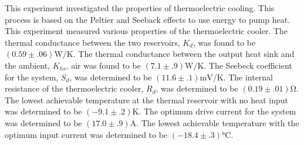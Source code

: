 

\physics

\begin{paperabs}
	
	This experiment investigated the properties of thermoelectric cooling. This
process is based on the Peltier and Seeback effects to use energy to pump heat.
This experiment measured various properties of the thermoelectric cooler.
The thermal conductance between the two reservoirs, $K_d$, was found to be $(0.59\pm.06)\si{\watt\per\kelvin}$.
The thermal conductance between the output heat sink and the ambient, $K_{hs}$, air was found to be $(7.1\pm.9)\si{\watt\per\kelvin}$.
The Seebeck coefficient for the system, $S_d$, was determined to be $(11.6\pm.1)\si{\milli\volt\per\kelvin}$.
The internal resistance of the thermoelectric cooler, $R_d$, was determined to be $(0.19\pm.01)\si{\ohm}$.
The lowest achievable temperature at the thermal reservoir with no heat input was determined to be $(-9.1\pm.2)\si{\kelvin}$.
The optimum drive current for the system was determined to be $(17.0\pm.9)\si{\ampere}$.
The lowest achievable temperature with the optimum input current was determined to be $(-18.4\pm.3)\si{\celsius}$.
	
\end{paperabs}


